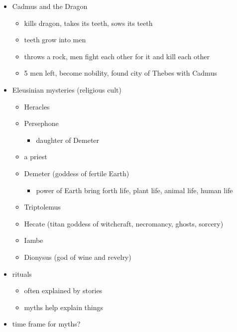 \documentclass[
  12pt]{findlay}
\providecommand{\tightlist}{%
  \setlength{\itemsep}{0pt}\setlength{\parskip}{0pt}}
\begin{document}
\begin{itemize}
\tightlist
\item
  Cadmus and the Dragon

  \begin{itemize}
  \tightlist
  \item
    kills dragon, takes its teeth, sows its teeth
  \item
    teeth grow into men
  \item
    throws a rock, men fight each other for it and kill each other
  \item
    5 men left, become nobility, found city of Thebes with Cadmus
  \end{itemize}
\item
  Eleusinian mysteries (religious cult)

  \begin{itemize}
  \tightlist
  \item
    Heracles
  \item
    Persephone

    \begin{itemize}
    \tightlist
    \item
      daughter of Demeter
    \end{itemize}
  \item
    a priest
  \item
    Demeter (goddess of fertile Earth)

    \begin{itemize}
    \tightlist
    \item
      power of Earth bring forth life, plant life, animal life, human
      life
    \end{itemize}
  \item
    Triptolemus
  \item
    Hecate (titan goddess of witchcraft, necromancy, ghosts, sorcery)
  \item
    Iambe
  \item
    Dionysus (god of wine and revelry)
  \end{itemize}
\item
  rituals

  \begin{itemize}
  \tightlist
  \item
    often explained by stories
  \item
    myths help explain things
  \end{itemize}
\item
  time frame for myths?


\end{itemize}
\end{document}
